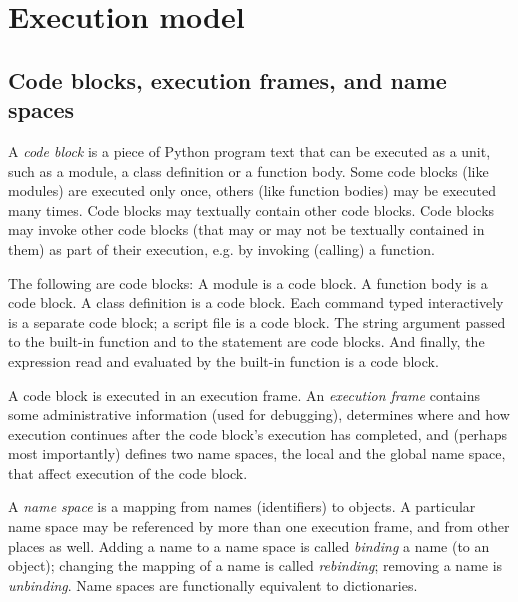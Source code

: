 \chapter{Execution model}

\section{Code blocks, execution frames, and name spaces} \label{execframes}

A {\em code block} is a piece of Python program text that can be
executed as a unit, such as a module, a class definition or a function
body.  Some code blocks (like modules) are executed only once, others
(like function bodies) may be executed many times.  Code blocks may
textually contain other code blocks.  Code blocks may invoke other
code blocks (that may or may not be textually contained in them) as
part of their execution, e.g. by invoking (calling) a function.

The following are code blocks:  A module is a code block.  A function
body is a code block.  A class definition is a code block.  Each
command typed interactively is a separate code block; a script file is
a code block.  The string argument passed to the built-in function
 and to the  statement are code blocks.
And finally, the expression read and evaluated by the built-in
function  is a code block.

A code block is executed in an execution frame.  An {\em execution
frame} contains some administrative information (used for debugging),
determines where and how execution continues after the code block's
execution has completed, and (perhaps most importantly) defines two
name spaces, the local and the global name space, that affect
execution of the code block.

A {\em name space} is a mapping from names (identifiers) to objects.
A particular name space may be referenced by more than one execution
frame, and from other places as well.  Adding a name to a name space
is called {\em binding} a name (to an object); changing the mapping of
a name is called {\em rebinding}; removing a name is {\em unbinding}.
Name spaces are functionally equivalent to dictionaries.

